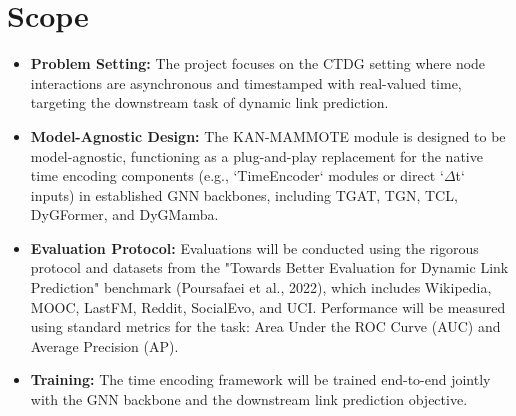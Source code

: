 \documentclass{article}
\begin{document}
\section*{Scope}
\begin{itemize}
  \item \textbf{Problem Setting:} The project focuses on the CTDG setting where node interactions are asynchronous and timestamped with real-valued time, targeting the downstream task of dynamic link prediction.
  \item \textbf{Model-Agnostic Design:} The KAN-MAMMOTE module is designed to be model-agnostic, functioning as a plug-and-play replacement for the native time encoding components (e.g., `TimeEncoder` modules or direct `$\Delta$t` inputs) in established GNN backbones, including TGAT, TGN, TCL, DyGFormer, and DyGMamba.
  \item \textbf{Evaluation Protocol:} Evaluations will be conducted using the rigorous protocol and datasets from the "Towards Better Evaluation for Dynamic Link Prediction" benchmark (Poursafaei et al., 2022), which includes Wikipedia, MOOC, LastFM, Reddit, SocialEvo, and UCI. Performance will be measured using standard metrics for the task: Area Under the ROC Curve (AUC) and Average Precision (AP).
  \item \textbf{Training:} The time encoding framework will be trained end-to-end jointly with the GNN backbone and the downstream link prediction objective.
\end{itemize}
\end{document}
